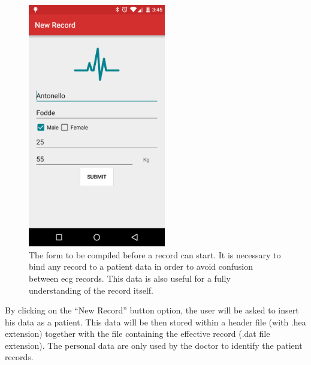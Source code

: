 \newline
\begin{figure}[ht!]
	\centering
	\includegraphics[width=60mm]
	{figures/ch10/2.png}
		\caption{The form to be compiled before a record can start. It is necessary to bind any record to a patient data in order to avoid confusion between ecg records. This data is also useful for a fully understanding of the record itself.}
	\label{fig10.2}
\end{figure}
By clicking on the “New Record” button option, the user will be asked to insert his data as a patient. This data will be then stored within a header file (with .hea extension)  together with the file containing the effective record (.dat file extension). The personal data are only used by the doctor to identify the patient records.